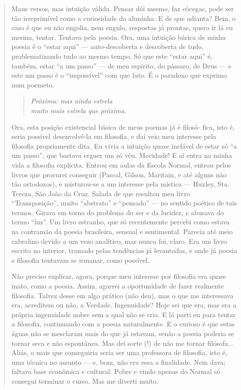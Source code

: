 \documentclass[12pt]{extarticle}
\begin{document}
\begin{enumerate}
\begin{quote}
Maus versos, mas intuição válida. Pensar dói mesmo, faz cócegas, pode
ser tão irreprimível como a curiosidade da aluninha. E de que adianta?
Bem, o caso é que eu não engolia, nem engulo, respostas já prontas,
quero ir lá eu mesma, tentar. Tentava pela poesia. Ora, uma intuição
básica de minha poesia é o ``estar aqui'' --- auto-descoberta e
descoberta de tudo, problematizando tudo ao mesmo tempo. Só que este
``estar aqui'' é, também, estar ``a um passo'' --- de meu espírito, do
pássaro, de Deus --- e este um passo é o ``impossível'' com que luto. É
o paradoxo que exprimo num poemeto.

\begin{verse}
\emph{Próxima: mas ainda estrela}\\
\emph{muito mais estrela que próxima.}
\end{verse}

Ora, esta posição existencial básica de meus poemas já é filosó- fica,
isto é, seria possível desenvolvê-la em filosofia, e daí veio meu
interesse pela filosofia propriamente dita. Eu vivia a intuição quase
inefável de estar só ``a um passo'', que bastava erguer um só véu.
Mocidade! E aí entra na minha vida a filosofia explícita. Entrou em
aulas da Escola Normal, entrou pelos livros que procurei conseguir
(Pascal, Gilson, Maritain, e até alguns não tão ortodoxos), e
misturou-se a um interesse pela mística --- Huxley, Sta. Tereza, São
João da Cruz. Salada de que resultou meu livro ``Transposição'', muito
``abstrato'' e ``pensado'' --- no sentido poético de tais termos. Girava
em torno do problema do ser e da lucidez, e abusava do termo ``luz''. Um
livro estranho, que só recentemente percebi como estava na contramão da
poesia brasileira, sensual e sentimental. Parecia até meio cabralino
devido a um vezo analítico, mas nunca foi, claro. Era um livro escrito
no interior, tramado pelas tendências já levantadas, e onde já poesia e
filosofia tentavam se irmanar, como possível.

Não preciso explicar, agora, porque meu interesse por filosofia era
quase inato, como a poesia. Assim, agarrei a oportunidade de fazer
realmente filosofia. Talvez desse em algo prático (não deu), mas o que
me interessava era, acreditem ou não, a Verdade. Ingenuidade? Hoje sei
que era, mas era a própria ingenuidade nobre sem a qual não se cria. E
lá parti eu para tentar a filosofia, continuando com a poesia
naturalmente. E o curioso é que estas águas não se mesclaram mais do que
já estavam, senão a poesia poderia se tornar seca e não espontânea. Mas
dei sorte (!) de não me tornar filósofa... Aliás, o mais que conseguiria
seria ser uma professora de filosofia, isto é, uma técnica no assunto
--- e, bom, não era essa a finalidade. Nem dava; faltava base econômica
e cultural. Pobre e vindo apenas do Normal só consegui terminar o curso.
Mas me diverti muito.
\end{quote}


\end{enumerate}
\end{document}

